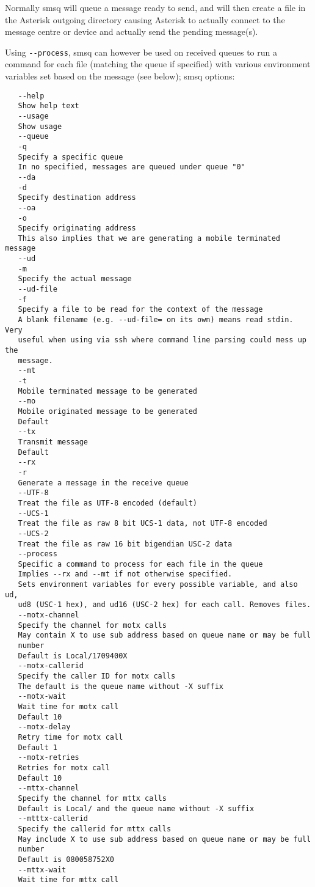    Normally smsq will queue a message ready to send, and will then create
   a file in the Asterisk outgoing directory causing Asterisk to actually
   connect to the message centre or device and actually send the pending
   message(s).

   Using \verb!--process!, smsq can however be used on received queues to run a
   command for each file (matching the queue if specified) with various
   environment variables set based on the message (see below);
   smsq options:
\begin{verbatim}
   --help
   Show help text
   --usage
   Show usage
   --queue
   -q
   Specify a specific queue
   In no specified, messages are queued under queue "0"
   --da
   -d
   Specify destination address
   --oa
   -o
   Specify originating address
   This also implies that we are generating a mobile terminated message
   --ud
   -m
   Specify the actual message
   --ud-file
   -f
   Specify a file to be read for the context of the message
   A blank filename (e.g. --ud-file= on its own) means read stdin. Very
   useful when using via ssh where command line parsing could mess up the
   message.
   --mt
   -t
   Mobile terminated message to be generated
   --mo
   Mobile originated message to be generated
   Default
   --tx
   Transmit message
   Default
   --rx
   -r
   Generate a message in the receive queue
   --UTF-8
   Treat the file as UTF-8 encoded (default)
   --UCS-1
   Treat the file as raw 8 bit UCS-1 data, not UTF-8 encoded
   --UCS-2
   Treat the file as raw 16 bit bigendian USC-2 data
   --process
   Specific a command to process for each file in the queue
   Implies --rx and --mt if not otherwise specified.
   Sets environment variables for every possible variable, and also ud,
   ud8 (USC-1 hex), and ud16 (USC-2 hex) for each call. Removes files.
   --motx-channel
   Specify the channel for motx calls
   May contain X to use sub address based on queue name or may be full
   number
   Default is Local/1709400X
   --motx-callerid
   Specify the caller ID for motx calls
   The default is the queue name without -X suffix
   --motx-wait
   Wait time for motx call
   Default 10
   --motx-delay
   Retry time for motx call
   Default 1
   --motx-retries
   Retries for motx call
   Default 10
   --mttx-channel
   Specify the channel for mttx calls
   Default is Local/ and the queue name without -X suffix
   --mtttx-callerid
   Specify the callerid for mttx calls
   May include X to use sub address based on queue name or may be full
   number
   Default is 080058752X0
   --mttx-wait
   Wait time for mttx call

\end{verbatim}
